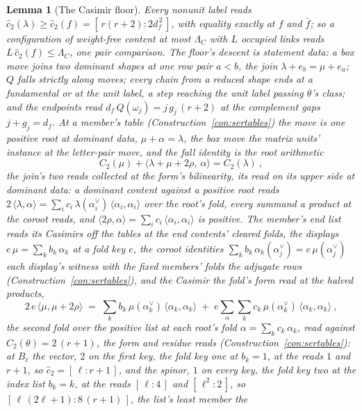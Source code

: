 \documentclass[11pt]{article}
\newtheorem{lemma}{Lemma}
\theoremstyle{definition}
\begin{document}
\begin{lemma}[The Casimir floor]\label{lem:casfloor}
Every nonunit label reads
$\hat c_2(\lambda)\ge\hat c_2(f)=[\,r(r+2):2d_f^{\,2}\,]$, with equality
exactly at $f$ and $\bar f$; so a configuration of weight-free content at
most $\Lambda_C$ with $L$ occupied links reads
$L\,\hat c_2(f)\le\Lambda_C$, one pair comparison. The floor's
descent is statement data: a \emph{box move} joins two dominant
shapes at one row pair $a<b$, the join $\lambda+e_b=\mu+e_a$; $Q$
falls strictly along moves; every chain from a reduced shape ends at
a fundamental or at the unit label, a step reaching the unit label
passing $\theta$'s class; and the endpoints read
$d_f\,Q(\omega_j)=j\,g_j\,(r+2)$ at the complement gaps
$j+g_j=d_f$. At a member's table
(Construction~\ref{con:sertables}) the move is one positive root
at dominant data, $\mu+\alpha=\lambda$, the box move the matrix
units' instance at the letter-pair move, and the fall identity is
the root arithmetic
\[
C_2(\mu)+\langle\lambda+\mu+2\rho,\ \alpha\rangle=C_2(\lambda)\ ,
\]
the join's two reads collected at the form's bilinearity, its
read on its upper side at dominant data: a dominant content
against a positive root reads
$2\,\langle\lambda,\alpha\rangle=\sum_ic_i\,\lambda(\alpha_i^\vee)
\,\langle\alpha_i,\alpha_i\rangle$ over the root's fold, every
summand a product at the coroot reads, and
$\langle2\rho,\alpha\rangle=\sum_ic_i\,\langle\alpha_i,\alpha_i
\rangle$ is positive. The member's \emph{end list} reads its
Casimirs off the tables at the end contents' \emph{cleared
folds}, the displays $e\,\mu=\sum_kb_k\,\alpha_k$ at a fold key
$e$, the coroot identities
$\sum_kb_k\,\alpha_k(\alpha_j^\vee)=e\,\mu(\alpha_j^\vee)$ each
display's witness with the fixed members' folds the adjugate rows
(Construction~\ref{con:sertables}), and the Casimir the fold's
form read at the halved products,
\[
2\,e\,\langle\mu,\mu+2\rho\rangle
\;=\;\sum_kb_k\,\mu(\alpha_k^\vee)\,\langle\alpha_k,\alpha_k\rangle
\;+\;e\sum_\alpha\sum_kc_k\,\mu(\alpha_k^\vee)\,
\langle\alpha_k,\alpha_k\rangle\ ,
\]
the second fold over the positive list at each root's fold
$\alpha=\sum_kc_k\,\alpha_k$, read against $C_2(\theta)=2\,(r+1)$,
the form and residue reads (Construction~\ref{con:sertables}):
at $B_\ell$ the vector, $2$ on the first
key, the fold key one at $b_k=1$, at the reads $1$ and
$r+1$, so $\hat
c_2=[\,\ell:r+1\,]$, and the spinor, $1$ on every key, the fold
key two at the index list $b_k=k$, at the
reads $[\,\ell:4\,]$ and $[\,\ell^2:2\,]$, so
$[\,\ell\,(2\ell+1):8\,(r+1)\,]$, the list's least member the

\end{lemma}
\end{document}
